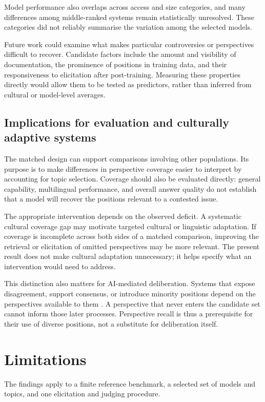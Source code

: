 \documentclass[11pt,a4paper]{article}
\begin{document}
Model performance also overlaps across access and size categories, and many differences among middle-ranked systems remain statistically unresolved. These categories did not reliably summarise the variation among the selected models.

Future work could examine what makes particular controversies or perspectives difficult to recover. Candidate factors include the amount and visibility of documentation, the prominence of positions in training data, and their responsiveness to elicitation after post-training. Measuring these properties directly would allow them to be tested as predictors, rather than inferred from cultural or model-level averages.

\subsection{Implications for evaluation and culturally adaptive systems}
\label{sec:Implications for evaluation and culturally adaptive systems}
The matched design can support comparisons involving other populations. Its purpose is to make differences in perspective coverage easier to interpret by accounting for topic selection. Coverage should also be evaluated directly: general capability, multilingual performance, and overall answer quality do not establish that a model will recover the positions relevant to a contested issue.

The appropriate intervention depends on the observed deficit. A systematic cultural coverage gap may motivate targeted cultural or linguistic adaptation. If coverage is incomplete across both sides of a matched comparison, improving the retrieval or elicitation of omitted perspectives may be more relevant. The present result does not make cultural adaptation unnecessary; it helps specify what an intervention would need to address.

This distinction also matters for AI-mediated deliberation. Systems that expose disagreement, support consensus, or introduce minority positions depend on the perspectives available to them \cite{tesslerAICanHelp2024a, chiangEnhancingAIAssistedGroup2024b, leeAmplifyingMinorityVoices2025a}. A perspective that never enters the candidate set cannot inform those later processes. Perspective recall is thus a prerequisite for their use of diverse positions, not a substitute for deliberation itself.

\section{Limitations}
\label{sec:Limitations}
The findings apply to a finite reference benchmark, a selected set of models and topics, and one elicitation and judging procedure.
\end{document}
